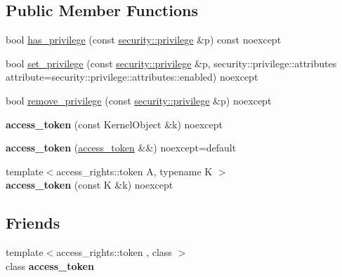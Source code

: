 \subsection*{Public Member Functions}
\begin{DoxyCompactItemize}
\item 
bool \mbox{\hyperlink{classdistant_1_1kernel__objects_1_1access__token_a6509ad02d8454898bdd591c6a70f55d5}{has\+\_\+privilege}} (const \mbox{\hyperlink{classdistant_1_1security_1_1privilege}{security\+::privilege}} \&p) const noexcept
\item 
bool \mbox{\hyperlink{classdistant_1_1kernel__objects_1_1access__token_aa51295b8d8f8602743d5d431806a29c4}{set\+\_\+privilege}} (const \mbox{\hyperlink{classdistant_1_1security_1_1privilege}{security\+::privilege}} \&p, security\+::privilege\+::attributes attribute=security\+::privilege\+::attributes\+::enabled) noexcept
\item 
bool \mbox{\hyperlink{classdistant_1_1kernel__objects_1_1access__token_aa396b0b32bd1f9aba79320a5104e0289}{remove\+\_\+privilege}} (const \mbox{\hyperlink{classdistant_1_1security_1_1privilege}{security\+::privilege}} \&p) noexcept
\item 
\mbox{\label{classdistant_1_1kernel__objects_1_1access__token_a98db4be610792be51a07631bb3016a70}} 
{\bfseries access\+\_\+token} (const Kernel\+Object \&k) noexcept
\item 
\mbox{\label{classdistant_1_1kernel__objects_1_1access__token_a9565c8e217a315df78664ef057b5fe18}} 
{\bfseries access\+\_\+token} (\mbox{\hyperlink{classdistant_1_1kernel__objects_1_1access__token}{access\+\_\+token}} \&\&) noexcept=default
\item 
\mbox{\label{classdistant_1_1kernel__objects_1_1access__token_a095187fef9d7ec7297666e2eebff949c}} 
{\footnotesize template$<$access\+\_\+rights\+::token A, typename K $>$ }\\{\bfseries access\+\_\+token} (const K \&k) noexcept
\end{DoxyCompactItemize}
\subsection*{Friends}
\begin{DoxyCompactItemize}
\item 
\mbox{\label{classdistant_1_1kernel__objects_1_1access__token_aae4643b98f37138b1f31ff510f3a3197}} 
{\footnotesize template$<$access\+\_\+rights\+::token , class $>$ }\\class {\bfseries access\+\_\+token}
\end{DoxyCompactItemize}
